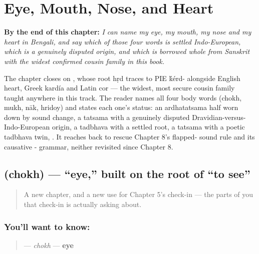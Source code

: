 
\chapter{Eye, Mouth, Nose, and Heart}
\label{ch:bn-eye-mouth-nose-heart}

\begin{chapteropening}
\textbf{By the end of this chapter:} \emph{I can name my eye, my mouth, my nose and my heart in Bengali, and say which of those four words is settled Indo-European, which is a genuinely disputed origin, and which is borrowed whole from Sanskrit with the widest confirmed cousin family in this book.}

The chapter closes on , whose root hṛd traces to PIE \'{k}érd- alongside English heart, Greek kardía and Latin cor — the widest, most secure cousin family taught anywhere in this track. The reader names all four body words (chokh, mukh, nāk, hridoy) and states each one's status:  an ardhatatsama half worn down by sound change,  a tatsama with a genuinely disputed Dravidian-versus-Indo-European origin,  a tadbhava with a settled root,  a tatsama with a poetic tadbhava twin, . It reaches back to rescue Chapter 8's flapped- sound rule and its causative - grammar, neither revisited since Chapter 8.
\end{chapteropening}

\section[\texorpdfstring{\bn{চোখ} (chokh)}{চোখ (chokh)}]{ (chokh) — \textquotedblleft{}eye,\textquotedblright{} built on the root of \textquotedblleft{}to see\textquotedblright{}}

\label{lesson:BN-C12-chokh}



\begin{quote}
A new chapter, and a new use for Chapter 5's check-in — the parts of you that check-in is actually asking about.
\end{quote}

\subsection*{You'll want to know: }
\begin{quote}
\textbf{} — \emph{chokh} — \textbf{eye}
\end{quote}

